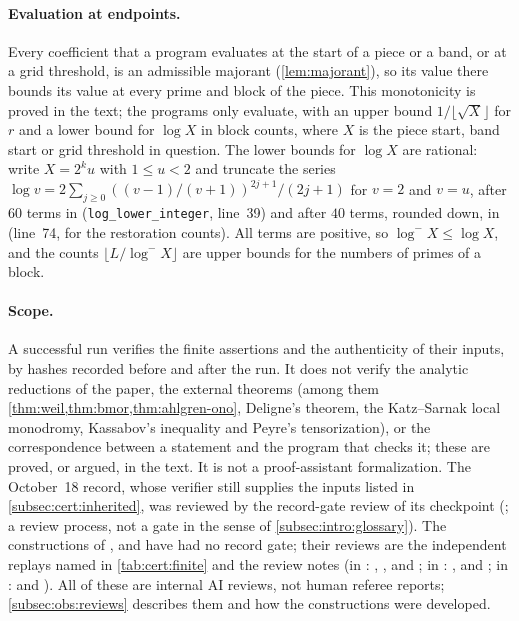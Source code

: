 \paragraph{Evaluation at endpoints.}
Every coefficient that a program evaluates at the start of a piece or a band,
or at a grid threshold, is an admissible majorant (\cref{lem:majorant}), so its
value there bounds its value at every prime and block of the piece. This
monotonicity is proved in the text; the programs only evaluate, with an upper
bound $1/\lfloor\sqrt X\rfloor$ for $r$ and a lower bound for
$\log X$ in block counts, where $X$ is the piece start, band start
or grid threshold in question. The lower bounds for $\log X$ are rational: write
$X=2^ku$ with $1\le u<2$ and truncate the series
$\log v=2\sum_{j\ge0}((v-1)/(v+1))^{2j+1}/(2j+1)$ for $v=2$ and $v=u$, after $60$
terms in 
(\texttt{log\_lower\_integer}, line~39) and after $40$ terms, rounded down, in
 (line~74, for
the restoration counts). All terms are positive, so $\log^-X\le\log X$, and the
counts $\lfloor L/\log^-X\rfloor$ are upper bounds for the numbers of primes of
a block.

\paragraph{Scope.}
A successful run verifies the finite assertions and the authenticity of
their inputs, by hashes recorded before and after the run. It does not verify
the analytic reductions of the paper, the external theorems (among them
\cref{thm:weil,thm:bmor,thm:ahlgren-ono}, Deligne's theorem, the Katz--Sarnak
local monodromy, Kassabov's inequality and Peyre's tensorization), or the
correspondence between a statement and the program that checks it; these are
proved, or argued, in the text. It is not a proof-assistant formalization.
The October~18 record, whose verifier still supplies the inputs listed in
\cref{subsec:cert:inherited}, was reviewed by the record-gate review of its
checkpoint (; a review
process, not a gate in the sense of \cref{subsec:intro:glossary}). The constructions of
, 
and  have had no record gate; their
reviews are the independent replays named in \cref{tab:cert:finite} and the
review notes (in :
, ,
 and
; in
:
,
 and
; in :
 and ). All of these are
internal AI reviews, not human referee reports; \cref{subsec:obs:reviews}
describes them and how the constructions were developed.

